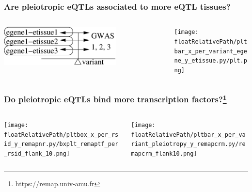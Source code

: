 \documentclass{beamer}
\newcommand*{\floatRelativePath}{../out/gwas417/pval_5e-08/r2_0.1/kb_1000/window_1000000/75_50}%
\begin{document}
    \begin{frame}
        \frametitle{Are pleiotropic eQTLs associated to more eQTL tissues?}

        \begin{columns}
            \begin{column}{0.5\textwidth}
                \begin{center}
                    \includegraphics[width=0.7\textwidth]{../presentation_230120_gold2022_paris/fig/model_pleio_etissues.png}
                \end{center}
            \end{column}
            \begin{column}{0.5\textwidth}  %
                \begin{center}
                    \texttt{[image: \\floatRelativePath/pltbar\_x\_per\_variant\_egene\_y\_etissue.py/plt.png]}
                \end{center}
            \end{column}
        \end{columns}

    \end{frame}

    \begin{frame}
        \frametitle{Do pleiotropic eQTLs bind more transcription factors?\footnote{https://remap.univ-amu.fr}}

        \begin{columns}
            \begin{column}{0.5\textwidth}
                \begin{center}
                    \texttt{[image: \\floatRelativePath/pltbox\_x\_per\_rsid\_y\_remapnr.py/bxplt\_remaptf\_per\_rsid\_flank\_10.png]}
                \end{center}
            \end{column}
            \begin{column}{0.5\textwidth}  %
                \begin{center}
                    \texttt{[image: \\floatRelativePath/pltbar\_x\_per\_variant\_pleiotropy\_y\_remapcrm.py/remapcrm\_flank10.png]}
                \end{center}
            \end{column}
        \end{columns}


    \end{frame}
\end{document}
